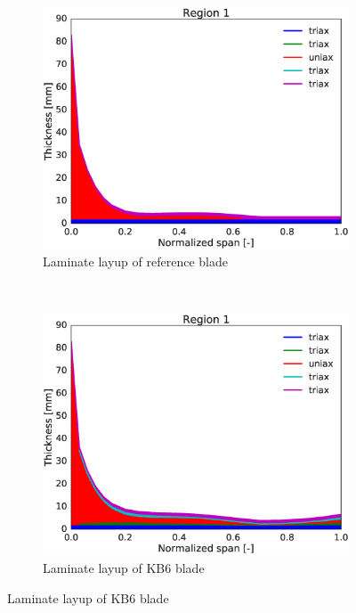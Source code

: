 \begin{figure}[tph]
\begin{subfigure}{0.50\textwidth}
\centering
\includegraphics[width=\linewidth]{figures/KB6_final/baseline_laminate_layers_r01.eps}
\caption{Laminate layup of reference blade}
\label{subfig:baseline_layers_r01}
\end{subfigure}
 ~
\begin{subfigure}{0.50\textwidth}
\includegraphics[width=\linewidth]{figures/KB6_final/KB6_laminate_layers_r01.eps}
\caption{Laminate layup of KB6 blade}
\label{subfig:KB6_layers_r01}
\end{subfigure}


\end{figure}
